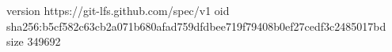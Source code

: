 version https://git-lfs.github.com/spec/v1
oid sha256:b5cf582c63cb2a071b680afad759dfdbee719f79408b0ef27cedf3c2485017bd
size 349692
